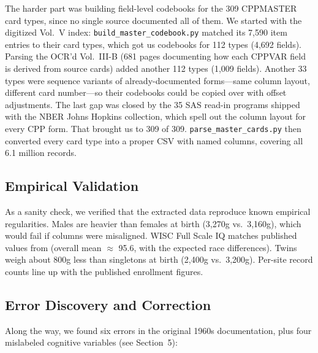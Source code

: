 \documentclass[12pt]{article}
\begin{document}
The harder part was building field-level codebooks for the 309 CPPMASTER card types, since no single source documented all of them. We started with the digitized Vol.\ V index: \texttt{build\_master\_codebook.py} matched its 7,590 item entries to their card types, which got us codebooks for 112 types (4,692 fields). Parsing the OCR'd Vol.\ III-B (681 pages documenting how each CPPVAR field is derived from source cards) added another 112 types (1,009 fields). Another 33 types were sequence variants of already-documented forms---same column layout, different card number---so their codebooks could be copied over with offset adjustments. The last gap was closed by the 35 SAS read-in programs shipped with the NBER Johns Hopkins collection, which spell out the column layout for every CPP form. That brought us to 309 of 309. \texttt{parse\_master\_cards.py} then converted every card type into a proper CSV with named columns, covering all 6.1 million records.

\subsection{Empirical Validation}

As a sanity check, we verified that the extracted data reproduce known empirical regularities. Males are heavier than females at birth (3,270g vs.\ 3,160g), which would fail if columns were misaligned. WISC Full Scale IQ matches published values from \citet{broman1975} (overall mean $\approx$ 95.6, with the expected race differences). Twins weigh about 800g less than singletons at birth (2,400g vs.\ 3,200g). Per-site record counts line up with the published enrollment figures.

\subsection{Error Discovery and Correction}

Along the way, we found six errors in the original 1960s documentation, plus four mislabeled cognitive variables (see Section~5):
\end{document}

